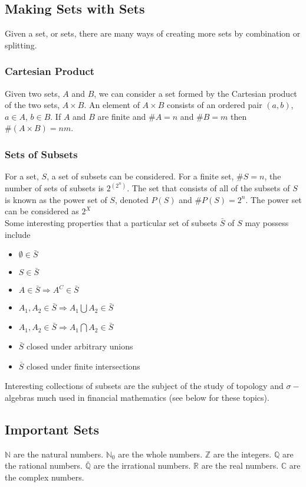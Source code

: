 \documentclass[a4paper]{scrartcl}
\begin{document}
\subsection{Making Sets with Sets}
Given a set, or sets, there are many ways of creating more sets by combination or splitting.

\subsubsection{Cartesian Product}
Given two sets, $A$ and $B$, we can consider a set formed by the Cartesian product of the two sets, $A \times B$. An element of $A\times B$ consists of an ordered pair $(a, b)$, $a\in A$, $b\in B$.
If $A$ and $B$ are finite and $\# A=n$ and $\# B=m$ then $\#(A\times B) = nm$.

\subsubsection{Sets of Subsets}
For a set, $S$, a set of subsets can be considered. For a finite set, $\#S = n$, the number of sets of subsets is $2^{(2^{n})}$. The set that consists of all of the subsets of $S$ is known as the power set of $S$, denoted $P(S)$ and $\# P(S) = 2^{n}$. The power set can be considered as $2^{X}$ \\

Some interesting properties that a particular set of subsets $\bar{S}$ of $S$ may possess include
\begin{itemize}
\item{$\emptyset\in\bar{S}$}
\item{$S\in\bar{S}$}
\item{$A\in\bar{S} \Rightarrow A^{C}\in\bar{S}$}
\item{$A_{1}, A_{2}\in\bar{S} \Rightarrow A_{1}\bigcup A_{2}\in\bar{S}$}
\item{$A_{1}, A_{2}\in\bar{S} \Rightarrow A_{1}\bigcap A_{2}\in\bar{S}$}
\item{$\bar{S}$ closed under arbitrary unions}
\item{$\bar{S}$ closed under finite intersections}
\end{itemize}

Interesting collections of subsets are the subject of the study of topology and $\sigma-$algebras much used in financial mathematics (see below for these topics). \\


\subsection{Important Sets}
$\mathbb{N}$ are the natural numbers. $\mathbb{N}_{0}$ are the whole numbers. $\mathbb{Z}$ are the integers. $\mathbb{Q}$ are the rational numbers. $\bar{\mathbb{Q}}$ are the irrational numbers. $\mathbb{R}$ are the real numbers. $\mathbb{C}$ are the complex numbers.
\end{document}
